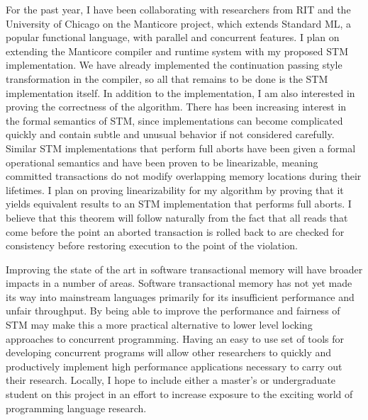 \documentclass[12pt]{article}
\begin{document}
For the past year, I have been collaborating with researchers from RIT and the University of Chicago on the Manticore project, which extends Standard ML, a popular functional language, with parallel and concurrent features.  I plan on extending the Manticore compiler and runtime system with my proposed STM implementation.  We have already implemented the continuation passing style transformation in the compiler, so all that remains to be done is the STM implementation itself.  In addition to the implementation, I am also interested in proving the correctness of the algorithm.  There has been increasing interest in the formal semantics of STM, since implementations can become complicated quickly and contain subtle and unusual behavior if not considered carefully.  Similar STM implementations that perform full aborts have been given a formal operational semantics and have been proven to be linearizable, meaning committed transactions do not modify overlapping memory locations during their lifetimes.  I plan on proving linearizability for my algorithm by proving that it yields equivalent results to an STM implementation that performs full aborts.  I believe that this theorem will follow naturally from the fact that all reads that come before the point an aborted transaction is rolled back to are checked for consistency before restoring execution to the point of the violation.

Improving the state of the art in software transactional memory will have broader impacts in a number of areas.  Software transactional memory has not yet made its way into mainstream languages primarily for its insufficient performance and unfair throughput.  By being able to improve the performance and fairness of STM may make this a more practical alternative to lower level locking approaches to concurrent programming. Having an easy to use set of tools for developing concurrent programs will allow other researchers to quickly and productively implement high performance applications necessary to carry out their research.  Locally, I hope to include either a master's or undergraduate student on this project in an effort to increase exposure to the exciting world of programming language research.  
\end{document}
